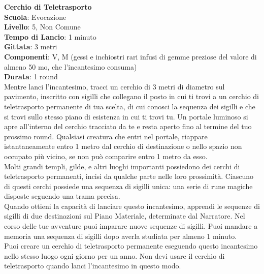 \begin{multicols}{2}
\medskip\textbf{Cerchio di Teletrasporto}\\
\textbf{Scuola}: Evocazione\\
\textbf{Livello}: 5, Non Comune\\
\textbf{Tempo di Lancio}: 1 minuto\\
\textbf{Gittata}: 3 metri\\
\textbf{Componenti}: V, M (gessi e inchiostri rari infusi di gemme preziose del valore di almeno 50 mo, che l'incantesimo consuma)\\
\textbf{Durata}: 1 round\\
Mentre lanci l'incantesimo, tracci un cerchio di 3 metri di diametro sul pavimento, inscritto con sigilli che collegano il posto in cui ti trovi a un cerchio di teletrasporto permanente di tua scelta, di cui conosci la sequenza dei sigilli e che si trovi sullo stesso piano di esistenza in cui ti trovi tu. Un portale luminoso si apre all'interno del cerchio tracciato da te e resta aperto fino al termine del tuo prossimo round. Qualsiasi creatura che entri nel portale, riappare istantaneamente entro 1 metro dal cerchio di destinazione o nello spazio non
occupato più vicino, se non può comparire entro 1 metro da esso.\\
Molti grandi templi, gilde, e altri luoghi importanti possiedono dei cerchi di teletrasporto permanenti, incisi da qualche parte nelle loro prossimità. Ciascuno di questi cerchi possiede una sequenza di sigilli unica: una serie di rune magiche disposte seguendo una trama precisa.\\ Quando ottieni la capacità di lanciare questo incantesimo, apprendi le sequenze di sigilli di
due destinazioni sul Piano Materiale, determinate dal Narratore. Nel corso delle tue avventure puoi imparare nuove sequenze di sigilli. Puoi mandare a memoria una sequenza di sigilli dopo averla studiata per almeno 1 minuto.\\
Puoi creare un cerchio di teletrasporto permanente eseguendo questo incantesimo nello stesso luogo ogni giorno per un anno. Non devi usare il cerchio di teletrasporto quando lanci l'incantesimo in questo modo.


\end{multicols}
